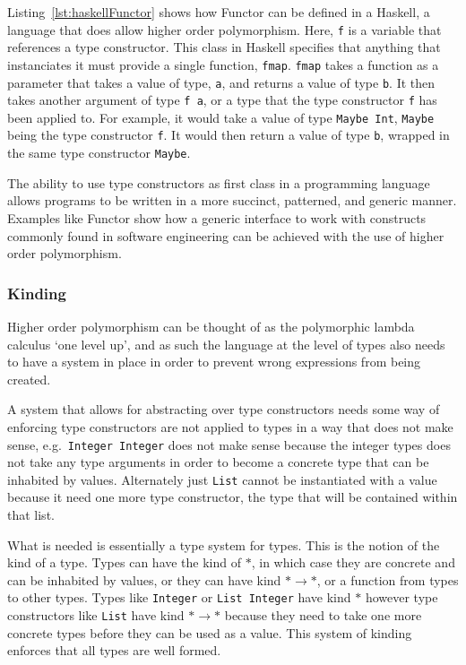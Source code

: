 Listing~\ref{lst:haskellFunctor} shows how Functor can be defined in a Haskell,
a language that does allow higher order polymorphism. Here, \lstinline{f} is a
variable that references a type constructor. This class in Haskell specifies
that anything that instanciates it must provide a single function,
\lstinline{fmap}.  \lstinline{fmap} takes a function as a parameter that takes
a value of type, \lstinline{a}, and returns a value of type \lstinline{b}. It
then takes another argument of type \lstinline{f a}, or a type that the type
constructor \lstinline{f} has been applied to. For example, it would take a
value of type \lstinline{Maybe Int}, \lstinline{Maybe} being the type
constructor \lstinline{f}. It would then return a value of type \lstinline{b},
wrapped in the same type constructor \lstinline{Maybe}.

The ability to use type constructors as first class in a programming language
allows programs to be written in a more succinct, patterned, and generic manner.
Examples like Functor show how a generic interface to work with constructs
commonly found in software engineering can be achieved with the use of higher
order polymorphism. 

\subsubsection{Kinding}

Higher order polymorphism can be thought of as the polymorphic lambda calculus
`one level up', and as such the language at the level of types also needs to 
have a system in place in order to prevent wrong expressions from being created.

A system that allows for abstracting over type constructors needs some way
of enforcing type constructors are not applied to types in a way that does not
make sense, e.g.\ \lstinline{Integer Integer} does not make sense because the
integer types does not take any type arguments in order to become a concrete
type that can be inhabited by values. Alternately just \lstinline{List} cannot
be instantiated with a value because it need one more type constructor, 
the type that will be contained within that list.

What is needed is essentially a type system for types. This is the notion of
the kind of a type. Types can have the kind of $ * $, in which case
they are concrete and can be inhabited by values, or they can have kind
$ * \rightarrow * $, or a function from types to other types. Types like
\lstinline{Integer} or \lstinline{List Integer} have kind $ * $ however
type constructors like \lstinline{List} have kind 
$ * \rightarrow * $ because they need to take one more concrete
types before they can be used as a value. This system of kinding enforces that
all types are well formed.

